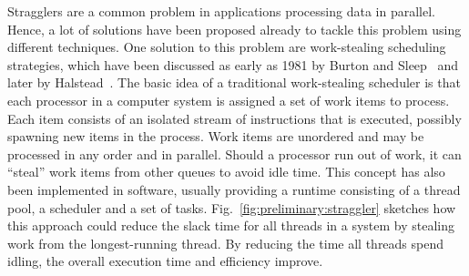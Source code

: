Stragglers are a common problem in applications processing data in parallel.
Hence, a lot of solutions have been proposed already to tackle this problem using different techniques.
One solution to this problem are work-stealing scheduling strategies, which have been discussed as early as 1981 by Burton and Sleep~\cite{burton1981executing} and later by Halstead~\cite{halstead1984implementation}.
The basic idea of a traditional work-stealing scheduler is that each processor in a computer system is assigned a set of work items to process.
Each item consists of an isolated stream of instructions that is executed, possibly spawning new items in the process.
Work items are unordered and may be processed in any order and in parallel.
Should a processor run out of work, it can \enquote{steal} work items from other queues to avoid idle time.
This concept has also been implemented in software, usually providing a runtime consisting of a thread pool, a scheduler and a set of tasks.
Fig.~\ref{fig:preliminary:straggler} sketches how this approach could reduce the slack time for all threads in a system by stealing work from the longest-running thread.
By reducing the time all threads spend idling, the overall execution time and efficiency improve.

